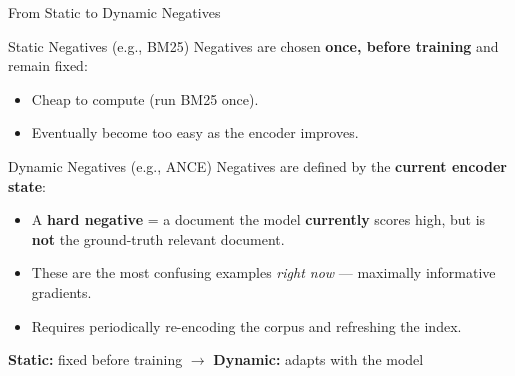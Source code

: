 \documentclass[aspectratio=169]{beamer}
\newif\ifanimated
\newcommand{\cpause}{\ifanimated\pause\fi}
\begin{document}
\begin{frame}{From Static to Dynamic Negatives}
\begin{block}{Static Negatives (e.g., BM25)}
Negatives are chosen \textbf{once, before training} and remain fixed:
\begin{itemize}
    \item Cheap to compute (run BM25 once).
    \item Eventually become too easy as the encoder improves.
\end{itemize}
\end{block}

\cpause
\vspace{0.5em}

\begin{exampleblock}{Dynamic Negatives (e.g., ANCE)}
Negatives are defined by the \textbf{current encoder state}:
\begin{itemize}
    \item A \textbf{hard negative} = a document the model \textbf{currently} scores high, but is \textbf{not} the ground-truth relevant document.
    \item These are the most confusing examples \emph{right now} --- maximally informative gradients.
    \item Requires periodically re-encoding the corpus and refreshing the index.
\end{itemize}
\end{exampleblock}

\cpause
\vspace{0.3em}

\begin{center}
\textbf{Static:} fixed before training \quad $\longrightarrow$ \quad \textbf{Dynamic:} adapts with the model
\end{center}
\end{frame}




\end{document}
